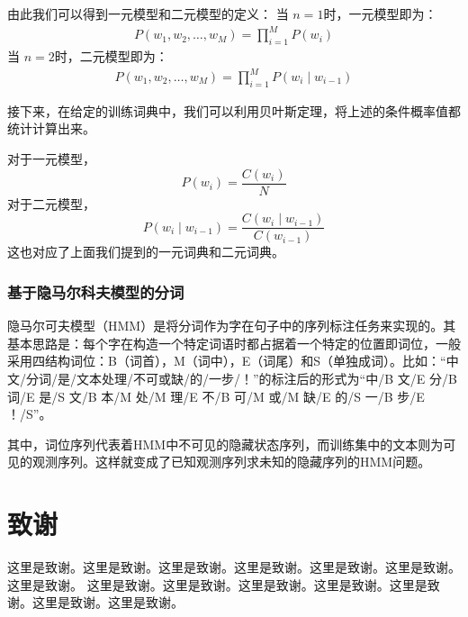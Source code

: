 \documentclass[11pt,a4paper]{article}
\begin{document}
由此我们可以得到一元模型和二元模型的定义：
当 $n=1$时，一元模型即为：
\begin{equation}
	\begin{aligned}
		P(w_{1}, w_{2}, \dots, w_{M})=\prod_{i=1}^{M} P(w_{i})
	\end{aligned}
\end{equation}
当 $n=2$时，二元模型即为：
\begin{equation}
	\begin{aligned}
		P(w_{1}, w_{2}, \dots, w_{M})=\prod_{i=1}^{M} P(w_{i} \mid w_{i-1})
	\end{aligned}
\end{equation}

接下来，在给定的训练词典中，我们可以利用贝叶斯定理，将上述的条件概率值都统计计算出来。

对于一元模型，
\begin{equation}
	P(w_{i})=\frac{C(w_{i})}{N}
\end{equation}
对于二元模型，
\begin{equation}
	P(w_{i} \mid w_{i-1})=\frac{C(w_{i} \mid w_{i-1})}{C(w_{i-1})}
\end{equation}
这也对应了上面我们提到的一元词典和二元词典。

\subsubsection{基于隐马尔科夫模型的分词}
隐马尔可夫模型（HMM）是将分词作为字在句子中的序列标注任务来实现的。其基本思路是：每个字在构造一个特定词语时都占据着一个特定的位置即词位，一般采用四结构词位：B（词首），M（词中），E（词尾）和S（单独成词）。比如：“中文/分词/是/文本处理/不可或缺/的/一步/！”的标注后的形式为“中/B 文/E 分/B 词/E 是/S 文/B 本/M 处/M 理/E 不/B 可/M 或/M 缺/E 的/S 一/B 步/E ！/S”。

其中，词位序列代表着HMM中不可见的隐藏状态序列，而训练集中的文本则为可见的观测序列。这样就变成了已知观测序列求未知的隐藏序列的HMM问题。





\section*{致谢}
这里是致谢。这里是致谢。这里是致谢。这里是致谢。这里是致谢。这里是致谢。这里是致谢。
这里是致谢。这里是致谢。这里是致谢。这里是致谢。这里是致谢。这里是致谢。这里是致谢。

\newpage


\end{document}
